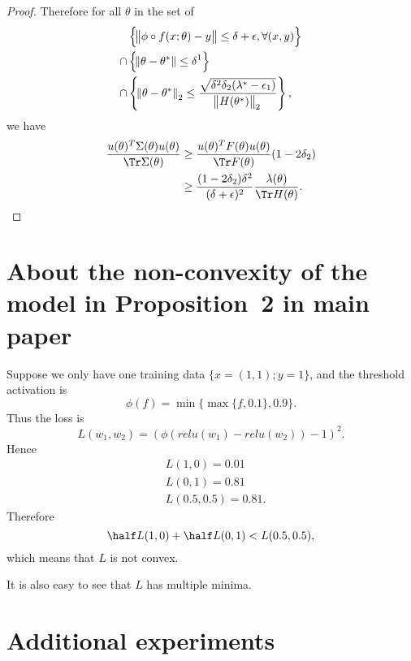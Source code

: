\documentclass{article}
\begin{document}
\begin{proof}
Therefore for all $\theta$ in the set of
\begin{equation}
\begin{aligned}
&\left\{ \norm{\phi \circ f(x;\theta)-y} \le \delta + \epsilon, \forall (x,y)\right\} \\
\cap &\left\{\norm{\theta - \theta^*} \le \delta^1 \right\} \\
\cap &\left\{\norm{\theta-\theta^*}_2 \le \frac{\sqrt{\delta^2\delta_2 (\lambda^* - \epsilon_1)}}{\norm{H(\theta^*)}_2} \right\},
\end{aligned}
\end{equation}
we have
\begin{align}
    \frac{u(\theta)^T \Sigma(\theta) u(\theta)}{\Tr \Sigma(\theta)} &\ge \frac{u(\theta)^T F(\theta) u(\theta)}{\Tr F(\theta)} (1-2\delta_2)\\
    &\ge \frac{(1-2\delta_2)\delta^2}{(\delta+\epsilon)^2} \frac{\lambda(\theta)}{\Tr H(\theta)}.
\end{align}

\end{proof}

\section{About the non-convexity of the model in Proposition~2 in main paper}
Suppose we only have one training data $\{x=(1,1); y=1\}$, and the threshold activation is
\begin{equation}
    \phi(f) = \min\{\max\{f, 0.1\}, 0.9\}.
\end{equation}
Thus the loss is
\begin{equation}
    L(w_1, w_2) = (\phi(relu(w_1) - relu(w_2)) - 1)^2.
\end{equation}
Hence
\begin{equation}
    \begin{aligned}
    & L(1, 0) = 0.01 \\
    & L(0, 1) = 0.81 \\
    & L(0.5, 0.5) = 0.81.
    \end{aligned}
\end{equation}
Therefore
\begin{equation}
    \half L(1,0) + \half L(0,1) < L(0.5, 0.5),
\end{equation}
which means that $L$ is not convex.

It is also easy to see that $L$ has multiple minima.

\section{Additional experiments}
\end{document}
